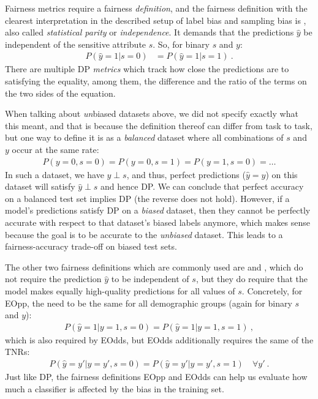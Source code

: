 Fairness metrics require a fairness \emph{definition},
and the fairness definition with the clearest interpretation in the described setup of label bias and sampling bias is ,
also called \emph{statistical parity} or \emph{independence}.
It demands that the predictions $\hat{y}$ be independent of the sensitive attribute \(s\).
So, for binary $s$ and $y$:
\begin{align}
  P(\hat{y}=1|s=0) &= P(\hat{y}=1|s=1)~.
  \label{eq:dp-def}
\end{align}
There are multiple \ac{DP} \emph{metrics} which track how close the predictions are to satisfying the equality,
among them, the difference and the ratio of the terms on the two sides of the equation.

When talking about \emph{un}biased datasets above,
we did not specify exactly what this meant,
and that is because the definition thereof can differ from task to task,
but one way to define it is as a \emph{balanced} dataset where all combinations of $s$ and $y$ occur at the same rate:
\begin{align}
  \label{eq:balanced-dataset}
  P(y=0,s=0)=P(y=0,s=1)=P(y=1,s=0)=\dots
\end{align}
In such a dataset, we have $y \perp s$, and thus,
perfect predictions ($\hat{y}=y$) on this dataset will satisfy $\hat{y} \perp s$ and hence \ac{DP}.
We can conclude that perfect accuracy on a balanced test set implies \acl{DP}
(the reverse does not hold).
However, if a model's predictions satisfy \ac{DP} on a \emph{biased} dataset,
then they cannot be perfectly accurate with respect to that dataset's biased labels anymore,
which makes sense because the goal is to be accurate to the \emph{unbiased} dataset.
This leads to a fairness-accuracy trade-off on biased test sets.

The other two fairness definitions which are commonly used are  and ,
which do not require the prediction $\hat{y}$ to be independent of $s$,
but they do require that the model makes equally high-quality predictions for all values of $s$.
Concretely, for \ac{EOpp}, the  need to be the same for all demographic groups
(again for binary $s$ and $y$):
\begin{align}
  \label{eq:eopp-def}
  P(\hat{y}=1|y=1,s=0) = P(\hat{y}=1|y=1,s=1)~,
\end{align}
which is also required by \ac{EOdds}, but \ac{EOdds} additionally requires the same of the \acp{TNR}:
\begin{align}
  P(\hat{y}=y'|y=y',s=0) = P(\hat{y}=y'|y=y',s=1)\quad\forall y'~.
  \label{eq:eodds-def}
\end{align}
Just like \ac{DP},
the fairness definitions \ac{EOpp} and \ac{EOdds} can help us evaluate
how much a classifier is affected by the bias in the training set.

